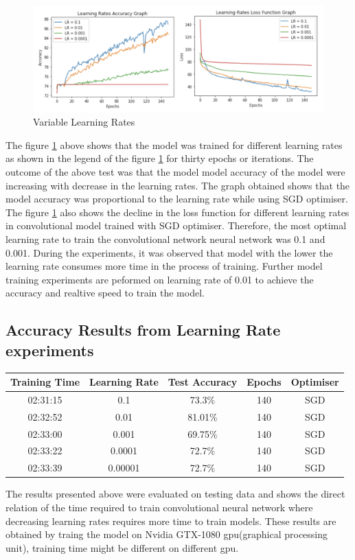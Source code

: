 \begin{figure}[!htp]
    \centering
    \includegraphics[width=15cm]{Images/lr.png}
    \caption{Variable Learning Rates}
    \label{fig:lrates}
\end{figure}

The figure \ref{fig:lrates} above shows that the model was trained for different learning rates as shown
in the legend of the figure \ref{fig:lrates} for thirty epochs or iterations. The outcome of the above test 
was that the model model accuracy of the model were increasing with decrease in the learning rates. 
The graph obtained shows that the model accuracy was proportional to the learning rate while using SGD optimiser. 
The figure \ref{fig:lrates} also shows the decline in the loss function for different learning rates in 
convolutional model trained with SGD optimiser. Therefore, the most optimal learning rate to train the convolutional network 
neural network was 0.1 and 0.001. During the experiments, it was observed that model with the lower the learning rate consumes more time in the 
process of training. Further model training experiments are peformed on 
learning rate of 0.01 to achieve the accuracy and realtive speed to train the model.
\pagebreak

\subsection*{Accuracy Results from Learning Rate experiments}

\begin{center}
    \begin{tabular} { | c | c | c | c | c |}
        \hline
        Training Time & Learning Rate & Test Accuracy & Epochs  & Optimiser\\ 
        \hline
        02:31:15 & 0.1 & 73.3\% & 140 & SGD \\ 
        \hline 
        02:32:52 & 0.01 & 81.01\% & 140 & SGD  \\
        \hline 
        02:33:00 & 0.001 & 69.75\% & 140 & SGD \\
        \hline
        02:33:22 & 0.0001 & 72.7\% & 140 & SGD \\
        \hline
        02:33:39 & 0.00001 & 72.7\% & 140 & SGD \\
        \hline
    \end{tabular}
\end{center}

The results presented above were evaluated on testing data and shows the 
direct relation of the time required to train convolutional neural network 
where decreasing learning rates requires more time to train models. These results 
are obtained by traing the model on Nvidia GTX-1080 gpu(graphical processing unit), training 
time might be different on different gpu.